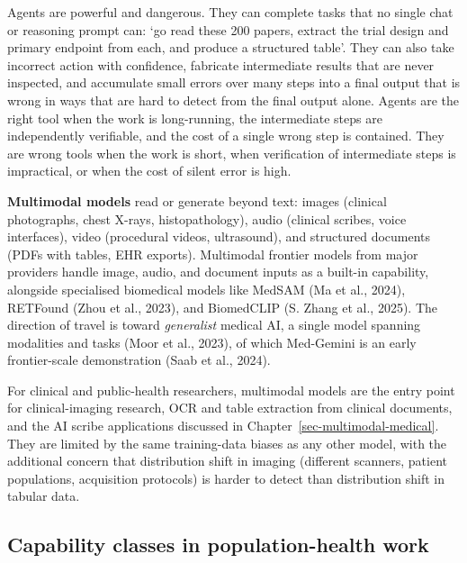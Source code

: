 \documentclass[
  letterpaper,
  11pt]{scrbook}
\begin{document}
Agents are powerful and dangerous. They can complete tasks that no
single chat or reasoning prompt can: `go read these 200 papers, extract
the trial design and primary endpoint from each, and produce a
structured table'. They can also take incorrect action with confidence,
fabricate intermediate results that are never inspected, and accumulate
small errors over many steps into a final output that is wrong in ways
that are hard to detect from the final output alone. Agents are the
right tool when the work is long-running, the intermediate steps are
independently verifiable, and the cost of a single wrong step is
contained. They are wrong tools when the work is short, when
verification of intermediate steps is impractical, or when the cost of
silent error is high.

\textbf{Multimodal models} read or generate beyond text: images
(clinical photographs, chest X-rays, histopathology), audio (clinical
scribes, voice interfaces), video (procedural videos, ultrasound), and
structured documents (PDFs with tables, EHR exports). Multimodal
frontier models from major providers handle image, audio, and document
inputs as a built-in capability, alongside specialised biomedical models
like MedSAM (Ma et al., 2024), RETFound ({Zhou et al.}, 2023), and
BiomedCLIP (S. Zhang et al., 2025). The direction of travel is toward
\emph{generalist} medical AI, a single model spanning modalities and
tasks ({Moor et al.}, 2023), of which Med-Gemini is an early
frontier-scale demonstration ({Saab et al.}, 2024).

For clinical and public-health researchers, multimodal models are the
entry point for clinical-imaging research, OCR and table extraction from
clinical documents, and the AI scribe applications discussed in
Chapter~\ref{sec-multimodal-medical}. They are limited by the same
training-data biases as any other model, with the additional concern
that distribution shift in imaging (different scanners, patient
populations, acquisition protocols) is harder to detect than
distribution shift in tabular data.

\subsection{Capability classes in population-health
work}\label{capability-classes-in-population-health-work}
\end{document}

